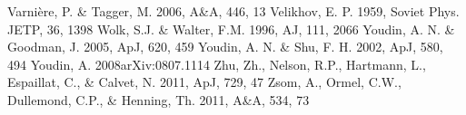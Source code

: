 \documentclass[apj]{emulateapj}
\begin{document}
\begin{thebibliography}{}
 Varni\`ere, P. \& Tagger, M. 2006, A\&A, 446, 13
 Velikhov, E. P. 1959, Soviet Phys. JETP, 36, 1398
 Wolk, S.J. \& Walter, F.M. 1996, AJ, 111, 2066
 Youdin, A. N. \& Goodman, J. 2005, ApJ, 620, 459
 Youdin, A. N. \& Shu, F. H. 2002, ApJ, 580, 494
 Youdin, A. 2008arXiv:0807.1114
 Zhu, Zh., Nelson, R.P., Hartmann, L.,  Espaillat, C., \& Calvet, N. 2011, ApJ, 729, 47
 Zsom, A., Ormel, C.W., Dullemond, C.P., \& Henning, Th. 2011, A\&A, 534, 73
\end{thebibliography}
\end{document}
